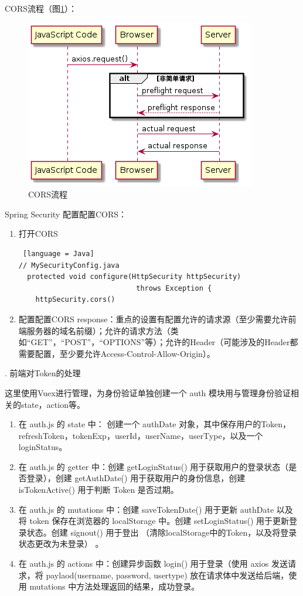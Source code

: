 CORS流程（图\ref{CORS-flow}）：

\begin{figure}[htbp]
  \centering
  \includegraphics[scale = 0.6]{out/uml/时序图/CORS-flow/CORS-flow.png}
  \caption{\song\wuhao CORS流程}
  \label{CORS-flow}
\end{figure}

Spring Security 配置配置CORS：

\begin{enumerate}
  \item 打开CORS \begin{lstlisting} [language = Java]
// MySecurityConfig.java
  protected void configure(HttpSecurity httpSecurity) 
                            throws Exception {
    httpSecurity.cors()
              \end{lstlisting}
  \item 配置配置CORS response：重点的设置有配置允许的请求源（至少需要允许前端服务器的域名前缀）；允许的请求方法（类如“GET”，“POST”，“OPTIONS”等）；允许的Header（可能涉及的Header都需要配置，至少要允许Access-Control-Allow-Origin）。
\end{enumerate}

. 前端对Token的处理

这里使用Vuex进行管理，为身份验证单独创建一个 auth 模块用与管理身份验证相关的state，action等。
\begin{enumerate}
  \item 在 auth.js 的 state 中： 创建一个 authDate 对象，其中保存用户的Token，refreshToken，tokenExp，userId，userName，userType，以及一个loginStatus。
  \item 在 auth.js 的 getter 中：创建 getLoginStatus() 用于获取用户的登录状态（是否登录），创建 getAuthDate() 用于获取用户的身份信息，创建 isTokenActive() 用于判断 Token 是否过期。
  \item 在 auth.js 的 mutations 中：创建 saveTokenDate() 用于更新 authDate 以及 将 token 保存在浏览器的 localStorage 中。创建 setLoginStatus() 用于更新登录状态。创建 signout() 用于登出 （清除localStorage中的Token，以及将登录状态更改为未登录） 。
  \item 在 auth.js 的 actions 中：创建异步函数 login() 用于登录（使用 axios 发送请求，将 paylaod(username, password, usertype) 放在请求体中发送给后端，使用 mutations 中方法处理返回的结果，成功登录。
\end{enumerate}

